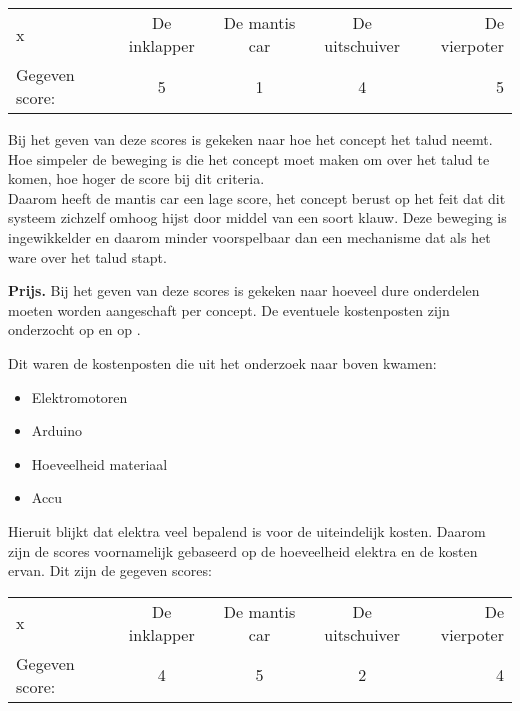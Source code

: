 \begin{center}
 \begin{tabular}{| l | c | c | c | r | }
  \hline			
  x & De inklapper & De mantis car & De uitschuiver & De vierpoter \\
  Gegeven score: &  5 & 1 & 4 & 5 \\
  \hline  
 \end{tabular}
\end{center}

Bij het geven van deze scores is gekeken naar hoe het concept het talud neemt. Hoe simpeler de beweging is die het concept moet maken om over het talud te komen, hoe hoger de score bij dit criteria.\\
Daarom heeft de mantis car een lage score, het concept berust op het feit dat dit systeem zichzelf omhoog hijst door middel van een soort klauw. Deze beweging is ingewikkelder en daarom minder voorspelbaar dan een mechanisme dat als het ware over het talud stapt.\\
\vspace{\baselineskip}

\textbf{Prijs.} Bij het geven van deze scores is gekeken naar hoeveel dure onderdelen moeten worden aangeschaft per concept. De eventuele kostenposten zijn onderzocht op \cite{Conrad} en op \cite{zwaard_delft} .

Dit waren de kostenposten die uit het onderzoek naar boven kwamen: \\

\begin{itemize}
    \item Elektromotoren
    \item Arduino
    \item Hoeveelheid materiaal
    \item Accu
\end{itemize}

Hieruit blijkt dat elektra veel bepalend is voor de uiteindelijk kosten. Daarom zijn de scores voornamelijk gebaseerd op de hoeveelheid elektra en de kosten ervan. Dit zijn de gegeven scores: \\

\begin{center}
 \begin{tabular}{| l | c | c | c | r | }
  \hline			
  x & De inklapper & De mantis car & De uitschuiver & De vierpoter \\
  Gegeven score: & 4 & 5 & 2 & 4 \\
  \hline  
 \end{tabular}
\end{center}

